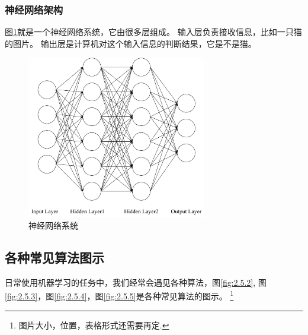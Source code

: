 \subsubsection{神经网络架构}
图\ref{fig:2.5.1}就是一个神经网络系统，它由很多层组成。
输入层负责接收信息，比如一只猫的图片。
输出层是计算机对这个输入信息的判断结果，它是不是猫。

\begin{figure}
  \centering
  \includegraphics[width=0.7\textwidth]{./img/ch2/mao.png}
  \caption{神经网络系统}
  \label{fig:2.5.1}
\end{figure}

\subsection{各种常见算法图示}
\label{ux5404ux79cdux5e38ux89c1ux7b97ux6cd5ux56feux793a}
日常使用机器学习的任务中，我们经常会遇见各种算法，图\ref{fig:2.5.2},
图\ref{fig:2.5.3}，图\ref{fig:2.5.4}，图\ref{fig:2.5.5}是各种常见算法的图示。
\footnote{图片大小，位置，表格形式还需要再定.}

